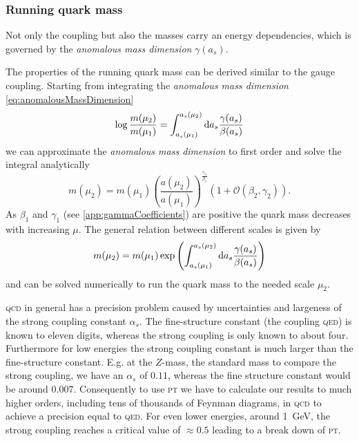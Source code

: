 \documentclass[../../index.tex]{subfiles}
\begin{document}
\subsubsection{Running quark mass}
Not only the coupling but also the masses carry an energy dependencies, which is
governed by the \textit{anomalous mass dimension} $\gamma(a_s)$.

The properties of the running quark mass can be derived similar to the gauge
coupling. Starting from integrating the \textit{anomalous mass dimension}
\cref{eq:anomalousMassDimension}
\begin{equation}
  \log \frac{m(\mu_2)}{m(\mu_1)} = \int_{a_s(\mu_1)}^{a_s(\mu_2)} \dif a_s \frac{\gamma(a_s)}{\beta(a_s)}
\end{equation}
we can approximate the \textit{anomalous mass dimension} to first order and
solve the integral analytically \cite{Schwab2002}
\begin{equation}
  m(\mu_2) = m(\mu_1)\left( \frac{a(\mu_2)}{a(\mu_1)} \right)^{\frac{\gamma_1}{\beta_1}} \left( 1 + \mathcal{O}(\beta_2, \gamma_2) \right).
\end{equation}
As $\beta_1$ and $\gamma_1$ (see \ref{app:gammaCoefficients}) are positive the
quark mass decreases with increasing $\mu$. The general relation between
different scales is given by
\begin{equation}
  m(\mu_2) = m(\mu_1) \exp \left( \int_{a_s(\mu_1)}^{a_s(\mu_2)} \dif a_s \frac{\gamma(a_s)}{\beta(a_s)}  \right)
\end{equation}
and can be solved numerically to run the quark mass to the needed scale $\mu_2$.

\textsc{qcd} in general has a precision problem caused by uncertainties and largeness of
the strong coupling constant $\alpha_s$. The fine-structure constant (the
coupling \textsc{qed}) is known to eleven digits, whereas the strong coupling
is only known to about four. Furthermore for low energies the strong coupling
constant is much larger than the fine-structure constant. E.g. at the $Z$-mass,
the standard mass to compare the strong coupling, we have an $\alpha_s$ of
$0.11$, whereas the fine structure constant would be around $0.007$.
Consequently to use \textsc{pt} we have to calculate our results to much higher orders,
including tens of thousands of Feynman diagrams, in \textsc{qcd} to achieve a precision
equal to \textsc{qed}. For even lower energies, around \SI{1}{\giga\eV}, the strong
coupling reaches a critical value of $\approx 0.5$ leading to a break down of
\textsc{pt}.
\end{document}
